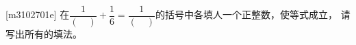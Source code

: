 [m3102701e]\quad
在$\dfrac{1}{(\quad)}+\dfrac{1}{6}=\dfrac{1}{(\quad)}$的括号中各填人一个正整数，使等式成立，
请写出所有的填法。
\par
{}